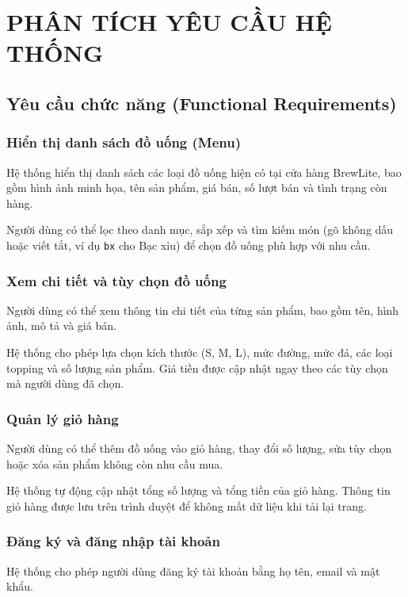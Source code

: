 \documentclass[12pt,a4paper]{article}
\begin{document}
\newpage
\section{PHÂN TÍCH YÊU CẦU HỆ THỐNG}
\subsection{Yêu cầu chức năng (Functional Requirements)}

\subsubsection{Hiển thị danh sách đồ uống (Menu)}
Hệ thống hiển thị danh sách các loại đồ uống hiện có tại cửa hàng BrewLite, bao gồm hình ảnh minh họa, tên sản phẩm, giá bán, số lượt bán và tình trạng còn hàng.

Người dùng có thể lọc theo danh mục, sắp xếp và tìm kiếm món (gõ không dấu hoặc viết tắt, ví dụ \texttt{bx} cho Bạc xỉu) để chọn đồ uống phù hợp với nhu cầu.

\subsubsection{Xem chi tiết và tùy chọn đồ uống}
Người dùng có thể xem thông tin chi tiết của từng sản phẩm, bao gồm tên, hình ảnh, mô tả và giá bán.

Hệ thống cho phép lựa chọn kích thước (S, M, L), mức đường, mức đá, các loại topping và số lượng sản phẩm. Giá tiền được cập nhật ngay theo các tùy chọn mà người dùng đã chọn.

\subsubsection{Quản lý giỏ hàng}
Người dùng có thể thêm đồ uống vào giỏ hàng, thay đổi số lượng, sửa tùy chọn hoặc xóa sản phẩm không còn nhu cầu mua.

Hệ thống tự động cập nhật tổng số lượng và tổng tiền của giỏ hàng. Thông tin giỏ hàng được lưu trên trình duyệt để không mất dữ liệu khi tải lại trang.

\subsubsection{Đăng ký và đăng nhập tài khoản}
Hệ thống cho phép người dùng đăng ký tài khoản bằng họ tên, email và mật khẩu.
\end{document}
